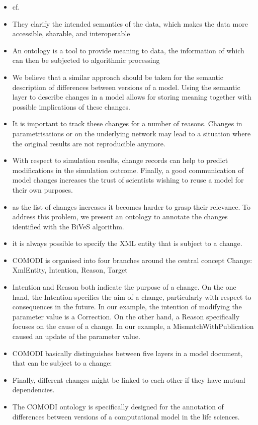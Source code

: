 	\begin{itemize}
		\item cf. \cite{Scharm2016}
		\item  They clarify the intended semantics of the data, which makes the data more accessible, sharable, and interoperable 
		\item An ontology is a tool to provide meaning to data, the information of which can then be subjected to algorithmic processing
		\item We believe that a similar approach should be taken for the semantic description of differences between versions of a model. Using the semantic layer to describe changes in a model allows for storing meaning together with possible implications of these changes.
		\item It is important to track these changes for a number of reasons. Changes in parametrisations or on the underlying network may lead to a situation where the original results are not reproducible anymore.
		\item With respect to simulation results, change records can help to predict modifications in the simulation outcome. Finally, a good communication of model changes increases the trust of scientists wishing to reuse a model for their own purposes.
		\item  as the list of changes increases it becomes harder to grasp their relevance. To address this problem, we present an ontology to annotate the changes identified with the BiVeS algorithm.
		\item  it is always possible to specify the XML entity that is subject to a change. 
		\item COMODI is organised into four branches around the central concept Change: XmlEntity, Intention, Reason, Target
		\item Intention and Reason both indicate the purpose of a change. On the one hand, the Intention specifies the aim of a change, particularly with respect to consequences in the future. In our example, the intention of modifying the parameter value is a Correction. On the other hand, a Reason specifically focuses on the cause of a change. In our example, a MismatchWithPublication caused an update of the parameter value.
		\item COMODI basically distinguishes between five layers in a model document, that can be subject to a change:
		\item Finally, different changes might be linked to each other if they have mutual dependencies.
		\item The COMODI ontology is specifically designed for the annotation of differences between versions of a computational model in the life sciences.

\end{itemize}
